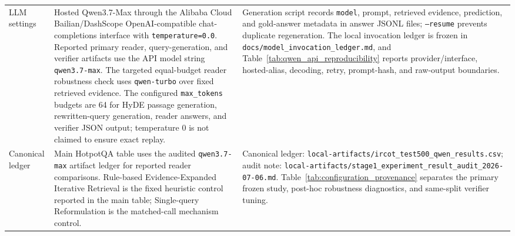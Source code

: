 \begin{table}[t]
\begin{threeparttable}
\begin{tabularx}{\textwidth}{>{\raggedright\arraybackslash}p{}
                            >{\raggedright\arraybackslash}p{}
                            >{\raggedright\arraybackslash}X}
LLM settings & Hosted Qwen3.7-Max through the Alibaba Cloud Bailian/DashScope OpenAI-compatible chat-completions interface with \texttt{temperature=0.0}. Reported primary reader, query-generation, and verifier artifacts use the API model string \texttt{qwen3.7-max}. The targeted equal-budget reader robustness check uses \texttt{qwen-turbo} over fixed retrieved evidence. The configured \texttt{max\_tokens} budgets are 64 for HyDE passage generation, rewritten-query generation, reader answers, and verifier JSON output; temperature 0 is not claimed to ensure exact replay. & Generation script records \texttt{model}, prompt, retrieved evidence, prediction, and gold-answer metadata in answer JSONL files; \texttt{--resume} prevents duplicate regeneration. The local invocation ledger is frozen in \texttt{docs/model\_invocation\_ledger.md}, and Table~\ref{tab:qwen_api_reproducibility} reports provider/interface, hosted-alias, decoding, retry, prompt-hash, and raw-output boundaries. \\
Canonical ledger & Main HotpotQA table uses the audited \texttt{qwen3.7-max} artifact ledger for reported reader comparisons. Rule-based Evidence-Expanded Iterative Retrieval is the fixed heuristic control reported in the main table; Single-query Reformulation is the matched-call mechanism control. & Canonical ledger: \texttt{local-artifacts/ircot\_test500\_qwen\_results.csv}; audit note: \texttt{local-artifacts/stage1\_experiment\_result\_audit\_2026-07-06.md}. Table~\ref{tab:configuration_provenance} separates the primary frozen study, post-hoc robustness diagnostics, and same-split verifier tuning. \\

\end{tabularx}
\end{threeparttable}
\end{table}
